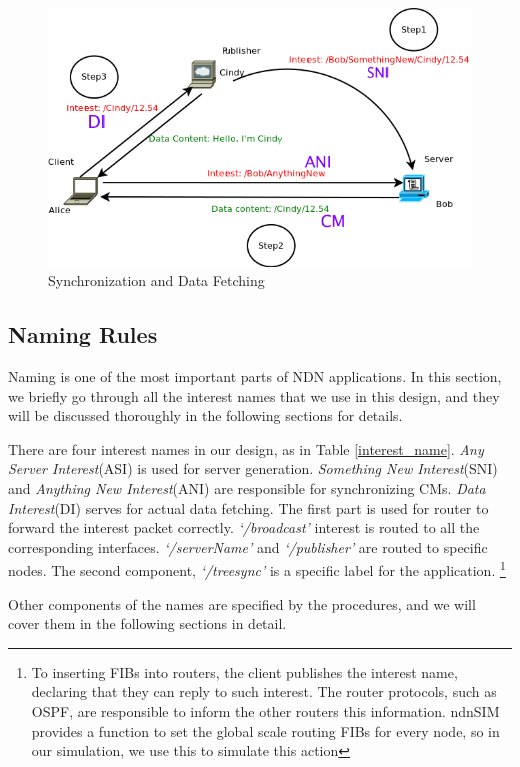 \documentclass[conference]{IEEEtran}
\begin{document}
\begin{figure}[!t]
\centering
\includegraphics[width=4.5in]{../png/synchronization.png}
\caption{Synchronization and Data Fetching}
\label{synchronization}
\end{figure}

\subsection{Naming Rules}

Naming is one of the most important parts of NDN applications.
In this section, we briefly go through all the interest names that we use in this design,
and they will be discussed thoroughly in the following sections for details.

There are four interest names in our design, as in Table \ref{interest_name}.
\emph{Any Server Interest}(ASI) is used for server generation.
\emph{Something New Interest}(SNI) and \emph{Anything New Interest}(ANI) are responsible for synchronizing CMs.
\emph{Data Interest}(DI) serves for actual data fetching.
The first part is used for router to forward the interest packet correctly.
\emph{`/broadcast'} interest is routed to all the corresponding interfaces.
\emph{`/serverName'} and \emph{`/publisher'} are routed to specific nodes.
The second component, \emph{`/treesync'} is a specific label for the application.
\footnote{To inserting FIBs into routers, the client publishes the interest name,
declaring that they can reply to such interest.
The router protocols, such as OSPF\cite{OSPF}\cite{OSPFN},
are responsible to inform the other routers this information.
ndnSIM provides a function to set the global scale routing FIBs for every node,
so in our simulation, we use this to simulate this action}

Other components of the names are specified by the procedures,
and we will cover them in the following sections in detail.
\end{document}
